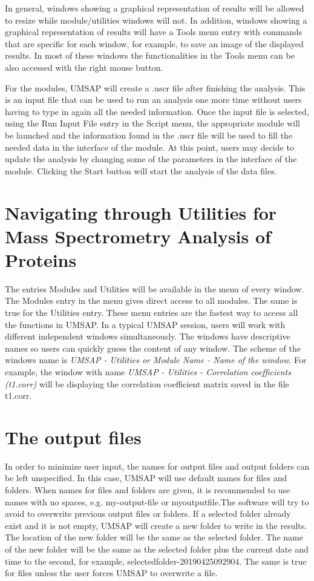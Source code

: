In general, windows showing a graphical representation of results will be allowed to resize while module/utilities windows will not. In addition, windows showing a graphical representation of results will have a Tools menu entry with commands that are specific for each window, for example, to save an image of the displayed results. In most of these windows the functionalities in the Tools menu can be also accessed with the right mouse button.

For the modules, UMSAP will create a .uscr file after finishing the analysis. This is an input file that can be used to run an analysis one more time without users having to type in again all the needed information. Once the input file is selected, using the Run Input File entry in the Script menu, the appropriate module will be launched and the information found in the .uscr file will be used to fill the needed data in the interface of the module. At this point, users may decide to update the analysis by changing some of the parameters in the interface of the module. Clicking the Start button will start the analysis of the data files.   

\section{Navigating through Utilities for Mass Spectrometry Analysis of Proteins}

The entries Modules and Utilities will be available in the menu of every window. The Modules entry in the menu gives direct access to all modules. The same is true for the Utilities entry. These menu entries are the fastest way to access all the functions in UMSAP. In a typical UMSAP session, users will work with different independent windows simultaneously. The windows have descriptive names so users can quickly guess the content of any window. The scheme of the windows name is \textit{UMSAP - Utilities or Module Name - Name of the window}. For example, the window with name \textit{UMSAP - Utilities - Correlation coefficients (t\num[detect-all]{1}.corr)} will be displaying the correlation coefficient matrix saved in the file t\num{1}.corr.

\section{The output files}

In order to minimize user input, the names for output files and output folders can be left unspecified. In this case, UMSAP will use default names for files and folders. When names for files and folders are given, it is recommended to use names with no spaces, e.g. my-output-file or myoutputfile.The software will try to avoid to overwrite previous output files or folders. If a selected folder already exist and it is not empty, UMSAP will create a new folder to write in the results. The location of the new folder will be the same as the selected folder. The name of the new folder will be the same as the selected folder plus the current date and time to the second, for example, selectedfolder-20190425092904. The same is true for files unless the user forces UMSAP to overwrite a file. 

